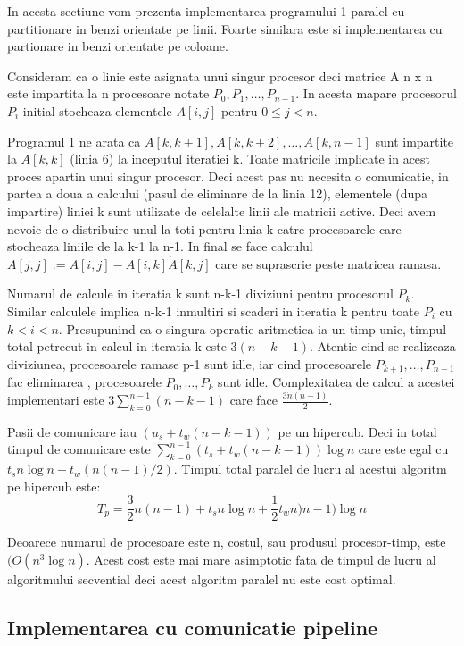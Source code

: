 \hspace{5mm}In acesta sectiune vom prezenta implementarea programului 1
paralel cu partitionare in benzi orientate pe linii. Foarte similara este si
implementarea cu partionare in benzi orientate pe coloane.

Consideram ca o linie este asignata unui singur procesor  deci matrice A n x
n este impartita la n procesoare notate $P_0,P_1,\ldots ,P_{n-1}$. In acesta
mapare procesorul $P_i$ initial stocheaza elementele $A[i,j]$ pentru $0\le
j<n$.

Programul 1 ne arata ca $A[k,k+1],A[k,k+2],\ldots, A[k,n-1]$ sunt
impartite la $A[k,k]$ (linia 6) la inceputul iteratiei k. Toate matricile
implicate in acest proces apartin unui singur procesor. Deci acest pas nu
necesita o comunicatie, in partea a doua a calcului (pasul de eliminare de
la linia 12), elementele (dupa impartire) liniei k sunt utilizate de
celelalte linii ale matricii active. Deci avem nevoie de o distribuire unul la
 toti  pentru linia k catre procesoarele care stocheaza liniile de la k-1 la
n-1. In final se face calculul $A[j,j]:=A[i,j]-A[i,k]\dot A[k,j]$ care se
suprascrie peste matricea ramasa.

Numarul de calcule in iteratia k sunt n-k-1 diviziuni pentru  procesorul
$P_k$. Similar calculele implica n-k-1 inmultiri si scaderi in iteratia k
pentru toate $P_i$ cu $k<i<n$. Presupunind ca o singura operatie aritmetica
ia un timp unic, timpul total petrecut in calcul in iteratia k este
$3(n-k-1)$. Atentie cind se realizeaza diviziunea, procesoarele ramase p-1
sunt idle, iar cind procesoarele $P_{k+1},\ldots,P_{n-1}$ fac eliminarea ,
procesoarele $P_0,\ldots,P_k$ sunt idle. Complexitatea de calcul a acestei
implementari este $3\sum_{k=0}^{n-1}(n-k-1)$ care face $\frac{3\dot
n(n-1)}{2}$.

Pasii de comunicare iau $(u_s+t_w(n-k-1))$ pe un hipercub. Deci in total
timpul de comunicare este $\sum_{k=0}^{n-1}(t_s+t_w(n-k-1))\log n$ care
este egal cu $t_sn\log n+t_w(n(n-1)/2)$. Timpul total paralel de lucru al
acestui algoritm pe hipercub este:
$$ T_p=\frac{3}{2}n(n-1)+t_sn\log n+\frac{1}{2}t_wn)n-1)\log n$$

Deoarece numarul de procesoare este n, costul, sau produsul procesor-timp,
este $(O(n^3\log n)$. Acest cost este mai mare asimptotic fata de timpul de
lucru al algoritmului secvential deci acest algoritm paralel nu este cost
optimal.

\subsection{Implementarea cu comunicatie pipeline}

